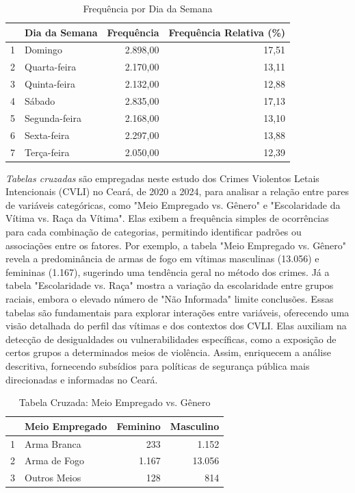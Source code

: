 \documentclass{exam}
\begin{document}
\begin{questions}
\begin{table}[H]
    \centering
    \begin{tabular}{rlrr}
        \toprule
        & \textbf{Dia da Semana} & \textbf{Frequência} & \textbf{Frequência Relativa (\%)} \\ 
        \midrule
        1 & Domingo & 2.898,00 & 17,51 \\ 
        2 & Quarta-feira & 2.170,00 & 13,11 \\ 
        3 & Quinta-feira & 2.132,00 & 12,88 \\ 
        4 & Sábado & 2.835,00 & 17,13 \\ 
        5 & Segunda-feira & 2.168,00 & 13,10 \\ 
        6 & Sexta-feira & 2.297,00 & 13,88 \\ 
        7 & Terça-feira & 2.050,00 & 12,39 \\ 
        \bottomrule
    \end{tabular}
    \caption{Frequência por Dia da Semana}
    \label{tab:freq_dia_semana}
\end{table}

\question 
\textit{Tabelas cruzadas} são empregadas neste estudo dos Crimes Violentos Letais Intencionais (CVLI) no Ceará, de 2020 a 2024, para analisar a relação entre pares de variáveis categóricas, como "Meio Empregado vs. Gênero" e "Escolaridade da Vítima vs. Raça da Vítima". Elas exibem a frequência simples de ocorrências para cada combinação de categorias, permitindo identificar padrões ou associações entre os fatores. Por exemplo, a tabela "Meio Empregado vs. Gênero" revela a predominância de armas de fogo em vítimas masculinas (13.056) e femininas (1.167), sugerindo uma tendência geral no método dos crimes. Já a tabela "Escolaridade vs. Raça" mostra a variação da escolaridade entre grupos raciais, embora o elevado número de "Não Informada" limite conclusões. Essas tabelas são fundamentais para explorar interações entre variáveis, oferecendo uma visão detalhada do perfil das vítimas e dos contextos dos CVLI. Elas auxiliam na detecção de desigualdades ou vulnerabilidades específicas, como a exposição de certos grupos a determinados meios de violência. Assim, enriquecem a análise descritiva, fornecendo subsídios para políticas de segurança pública mais direcionadas e informadas no Ceará.

\begin{table}[H]
    \centering
    \begin{tabular}{rlrr}
        \toprule
        & \textbf{Meio Empregado} & \textbf{Feminino} & \textbf{Masculino} \\ 
        \midrule
        1 & Arma Branca & 233 & 1.152 \\ 
        2 & Arma de Fogo & 1.167 & 13.056 \\ 
        3 & Outros Meios & 128 & 814 \\ 
        \bottomrule
    \end{tabular}
    \caption{Tabela Cruzada: Meio Empregado vs. Gênero}
    \label{tab:cruzada_meio_genero}
\end{table}


\end{questions}
\end{document}
